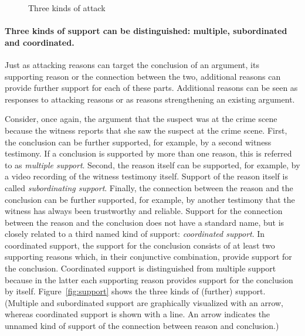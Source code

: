\documentclass[10pt]{article}
\begin{document}
\begin{figure}[bt]
\centering

\caption{Three kinds of attack\label{fig:arg3}}
\end{figure}

\paragraph{Three kinds of support can be distinguished: multiple, subordinated and coordinated.}


Just as attacking reasons can target the conclusion of an argument, its supporting
reason or the connection between the two, additional reasons 
can provide further support for each of these parts. %
Additional reasons can be seen as responses to attacking reasons or as reasons strengthening an existing argument. 

Consider, once again, the argument that the suspect was at the crime scene because the witness reports that she saw the suspect at the crime scene. 
First, the conclusion can be further supported, for example, by a second witness testimony. 
If a conclusion is supported by more than one reason, this is referred 
to as \textit{multiple support}. 
%
Second, the reason itself can be supported, for example, 
by a video recording of the witness testimony itself. 
Support of the reason itself is called \textit{subordinating support}. 
%
Finally, the connection between the reason and the conclusion can be further supported, for example, 
by another testimony that the witness has always been trustworthy and reliable. 
Support for the connection between the reason and the conclusion does not have a standard name, but is closely related 
to a third named kind of support: \textit{coordinated support}. In coordinated support, the support for the conclusion consists of at least 
two supporting reasons which, in their conjunctive combination, provide support for the conclusion. Coordinated support is distinguished from multiple support because in the latter each supporting reason 
provides support for the conclusion by itself. 
%
Figure~\ref{fig:support} shows the three kinds of (further) support. (Multiple and subordinated support are graphically visualized with an arrow, whereas coordinated support is shown with a line. An arrow indicates the unnamed kind of support of the connection between reason and conclusion.)
\end{document}
